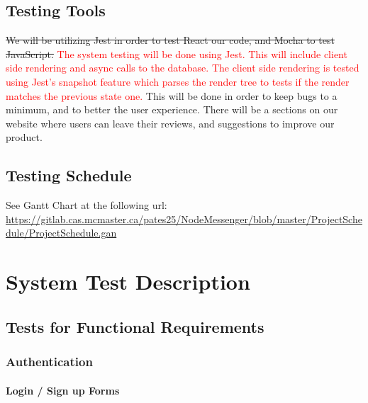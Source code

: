 \documentclass[12pt, titlepage]{article}
\begin{document}
\subsection{Testing Tools}
\sout{We will be utilizing Jest in order to test React our code, and Mocha to test JavaScript.} \textcolor{red}{The system testing will be done using Jest. This will include client side rendering and async calls to the database. The client side rendering is tested using Jest's snapshot feature which parses the render tree to tests if the render matches the previous state one.} This will be done in order to keep bugs to a minimum, and to better the user experience. There will be a sections on our website where users can leave their reviews, and suggestions to improve our product.

\subsection{Testing Schedule}
		
See Gantt Chart at the following url:\\
\url{https://gitlab.cas.mcmaster.ca/pates25/NodeMessenger/blob/master/ProjectSchedule/ProjectSchedule.gan}

\section{System Test Description}
	
\subsection{Tests for Functional Requirements}

\subsubsection{Authentication}
\label{sec:auth}
		
\paragraph{Login / Sign up Forms}
\end{document}
